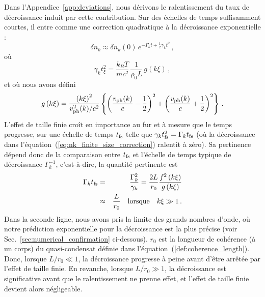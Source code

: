 \documentclass[aps,prd,notitlepage,amsfonts,amssymb,amsmath,nofootinbib,superscriptaddress,longbibliography]{revtex4-2}
\newcommand{\trad}[1]{\textcolor{tradcolor}{#1}}
\begin{document}
\trad{Dans l'Appendice~\ref{app:deviations}, nous dérivons le ralentissement du taux de décroissance induit par cette contribution. Sur des échelles de temps suffisamment courtes, il entre comme une correction quadratique à la décroissance exponentielle :
\begin{equation*}
\delta n_{k} \approx \delta n_{k}(0) \, e^{-\Gamma_{k}t + \frac{1}{2} \gamma_{k} t^{2}} \,,
\label{eq:nk_finite_size_correction}
\end{equation*}
où
\begin{equation*}
\gamma_{k} t_{\xi}^2  = \frac{k_{B}T}{mc^{2}} \, \frac{1}{\rho_{0}L} \, g \left(k \xi\right) \,,
\label{def:prediction_small_gamma}
\end{equation*}
et où nous avons défini
\begin{equation*}
g\left(k\xi\right) = \frac{\left(k\xi\right)^{2}}{v_{\rm ph}^{2}(k)/c^{2}} \left\{ \left(\frac{v_{\rm ph}(k) }{c} - \frac{1}{2}\right)^{2} + \left(\frac{v_{\rm ph}(k) }{c} + \frac{1}{2}\right)^{2} \right\} \,.
\end{equation*}
L'effet de taille finie croît en importance au fur et à mesure que le temps progresse, sur une échelle de temps $t_{\rm fs}$ telle que $\gamma_{k} t_{\rm fs}^{2} = \Gamma_{k} t_{\rm fs}$ (où la décroissance dans l'équation~(\ref{eq:nk_finite_size_correction}) ralentit à zéro). Sa pertinence dépend donc de la comparaison entre $t_{\rm fs}$ et l'échelle de temps typique de décroissance $\Gamma_k^{-1}$, c'est-à-dire, la quantité pertinente est
\begin{eqnarray*}
\Gamma_{k} t_{\rm fs} &=& \frac{\Gamma_{k}^{2}}{\gamma_{k}} = \frac{2 L}{r_{0}} \frac{f^2\left(k\xi\right)}{g\left(k\xi\right)} \nonumber \\
&\approx& \frac{L}{r_{0}} \quad \text{lorsque} \quad k\xi \gg 1 \,.
\end{eqnarray*}
Dans la seconde ligne, nous avons pris la limite des grands nombres d'onde, où notre prédiction exponentielle pour la décroissance est la plus précise (voir Sec.~\ref{sec:numerical_confirmation} ci-dessous). $r_0$ est la longueur de cohérence (à un corps) du quasi-condensat définie dans l'équation~(\ref{def:coherence_length}). Donc, lorsque $L/r_{0} \ll 1$, la décroissance progresse à peine avant d'être arrêtée par l'effet de taille finie. En revanche, lorsque $L/r_{0} \gg 1$, la décroissance est significative avant que le ralentissement ne prenne effet, et l'effet de taille finie devient alors négligeable.
}
\end{document}
